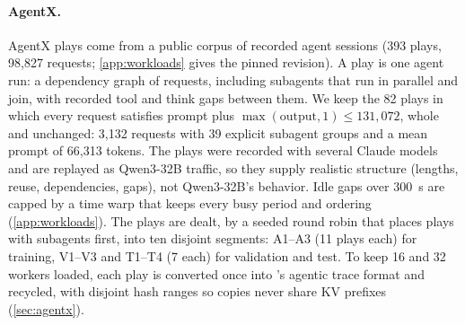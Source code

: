 \paragraph{AgentX.}
AgentX plays come from a public corpus of recorded agent sessions \citep{agentxtraces} (393 plays,
98,827 requests; \cref{app:workloads} gives the pinned revision). A play is one agent run: a dependency graph of requests, including subagents that
run in parallel and join, with recorded tool and think gaps between them. We keep the 82 plays
in which every request satisfies prompt plus $\max(\text{output}, 1) \le 131{,}072$, whole and
unchanged: 3,132 requests with 39 explicit subagent groups and a mean prompt of 66,313 tokens.
The plays were recorded with several Claude models and are replayed as Qwen3-32B traffic, so they supply
realistic structure (lengths, reuse, dependencies, gaps), not Qwen3-32B's behavior.
Idle gaps over \SI{300}{s} are capped by a time warp that keeps every busy period and ordering
(\cref{app:workloads}).
The plays are dealt, by a seeded round robin that places plays with subagents first, into ten
disjoint segments: A1--A3 (11 plays each) for training, V1--V3 and T1--T4 (7 each) for validation
and test. To keep 16 and 32 workers loaded, each play is converted once into \aisim{}'s agentic
trace format and recycled, with disjoint hash ranges so copies never share KV prefixes
(\cref{sec:agentx}).

